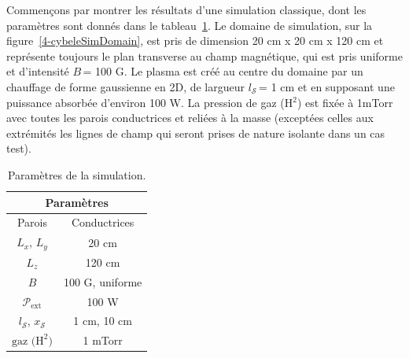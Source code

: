 \begin{refsection}
Commençons par montrer les résultats d'une simulation classique, dont les
paramètres sont donnés dans le tableau~\ref{4-CybeleParam1}. Le domaine de
simulation, sur la figure~\ref{4-cybeleSimDomain}, est pris de dimension 20
cm x 20 cm x 120 cm et représente toujours le plan transverse au
champ magnétique, qui est pris uniforme et d'intensité $B\,$= 100 G. Le plasma
est créé au centre du domaine par un chauffage de forme gaussienne en 2D, de
largueur $l_\mathcal{S}\,$= 1 cm et en supposant une puissance absorbée
d'environ 100 W.
La pression de gaz (H$^2$) est fixée à 1mTorr avec toutes les parois
conductrices et reliées à la masse (exceptées celles aux extrémités les lignes
de champ qui seront prises de nature isolante dans un cas test).

\begin{table}[!htbp]
\footnotesize\centering
{}
\begin{tabular}{cc}\toprule
\multicolumn{2}{c}{\bf Paramètres}\\
\midrule 
Parois & Conductrices\\
$L_x$, $L_y$ & 20 cm\\
$L_z$ & 120 cm\\
$B$&100 G, uniforme\\
$\mathcal{P}_\text{ext}$&100 W\\
$l_\mathcal{S}$, $x_\mathcal{S}$& 1 cm, 10 cm\\
$\text{gaz (H}^2\text{)}$ & 1 mTorr\\
\bottomrule
\end{tabular}
\caption{Paramètres de la simulation.}\label{4-CybeleParam1}
\end{table}


\end{refsection}
